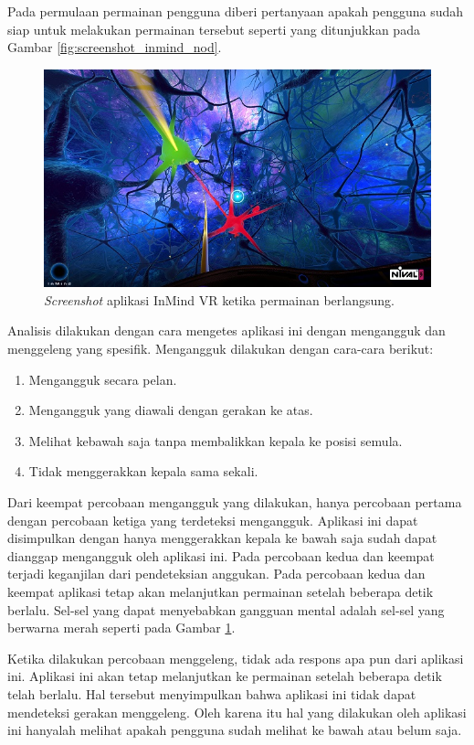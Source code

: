 Pada permulaan permainan pengguna diberi pertanyaan apakah pengguna sudah siap untuk melakukan permainan tersebut seperti yang ditunjukkan pada Gambar \ref{fig:screenshot_inmind_nod}.

\begin{figure}[htbp]
\centering
\includegraphics[scale=0.7]{Gambar/screenshot-inmind-gameplay.jpg}
\caption{\textit{Screenshot} aplikasi InMind VR ketika permainan berlangsung.}
\label{fig:screenshot_inmind_gameplay}
\end{figure}

Analisis dilakukan dengan cara mengetes aplikasi ini dengan mengangguk dan menggeleng yang spesifik. Mengangguk dilakukan dengan cara-cara berikut:
\begin{enumerate}
	\item Mengangguk secara pelan.
	\item Mengangguk yang diawali dengan gerakan ke atas.
	\item Melihat kebawah saja tanpa membalikkan kepala ke posisi semula.
	\item Tidak menggerakkan kepala sama sekali.
\end{enumerate}

Dari keempat percobaan mengangguk yang dilakukan, hanya percobaan pertama dengan percobaan ketiga yang terdeteksi mengangguk. Aplikasi ini dapat disimpulkan dengan hanya menggerakkan kepala ke bawah saja sudah dapat dianggap mengangguk oleh aplikasi ini. Pada percobaan kedua dan keempat terjadi keganjilan dari pendeteksian anggukan. Pada percobaan kedua dan keempat aplikasi tetap akan melanjutkan permainan setelah beberapa detik berlalu. Sel-sel yang dapat menyebabkan gangguan mental adalah sel-sel yang berwarna merah seperti pada Gambar \ref{fig:screenshot_inmind_gameplay}. 

Ketika dilakukan percobaan menggeleng, tidak ada respons apa pun dari aplikasi ini. Aplikasi ini akan tetap melanjutkan ke permainan setelah beberapa detik telah berlalu. Hal tersebut menyimpulkan bahwa aplikasi ini tidak dapat mendeteksi gerakan menggeleng. Oleh karena itu hal yang dilakukan oleh aplikasi ini hanyalah melihat apakah pengguna sudah melihat ke bawah atau belum saja.

